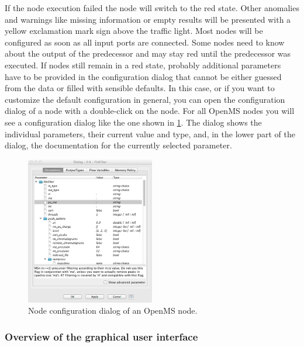 If the node execution failed the node will switch to the red state. Other anomalies and warnings like missing information or empty results 
will be presented with a yellow exclamation mark sign above the traffic light.
Most nodes will be configured as soon as all input ports are connected. Some nodes need to know about the output of the predecessor and may stay red until the predecessor was executed.
If nodes still remain in a red state, probably additional parameters have to be provided in the configuration dialog that cannot be either guessed from the data or filled with sensible defaults.
In this case, or if you want to customize the default configuration in general, you can open the configuration dialog of a node with a double-click on the node.
For all OpenMS nodes you will see a configuration dialog like the one shown in \cref{fig:knime_configure}.
The dialog shows the individual parameters, their current value and type, and, in the lower part of the dialog, the documentation for the currently selected parameter.

\begin{figure}
\centering
\includegraphics[width=0.5\textwidth]{graphics/knime_setup/knime_configure_dialog}
\caption{Node configuration dialog of an OpenMS node.}
\label{fig:knime_configure}
\end{figure}

\subsubsection{Overview of the graphical user interface}

